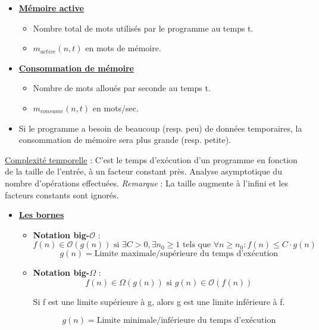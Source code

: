 \documentclass[fr,license=none,skiptoc]{../../../eplsummary}
\newcommand{\bigO}{\ensuremath{\mathcal{O}}}
\begin{document}
\begin{flushleft}
\begin{itemize}
\item \underline{\textbf {Mémoire active}}

\begin{itemize} [label=\textbullet, font=\MEDIUM]
\item Nombre total de mots utilisés par le programme au temps t.
\item $m_{active} (n,t)$ en mots de mémoire.
\end{itemize} \smallbreak

\item \underline{\textbf {Consommation de mémoire}}

\begin{itemize} [label=\textbullet, font=\MEDIUM]
\item Nombre de mots alloués par seconde au temps t.
\item $m_{consume} (n,t)$ en mots/sec.
\end{itemize}

\item Si le programme a besoin de beaucoup (resp. peu) de données temporaires, la consommation de mémoire sera plus grande (resp. petite).

\end{itemize} \bigbreak


\textcolor{mauvedef}{\underline{Complexité temporelle}} : C’est le temps d’exécution d’un programme en fonction de la taille de l’entrée, à un facteur constant près. Analyse asymptotique du nombre d'opérations effectuées. \textit{Remarque} : La taille augmente à l'infini et les facteurs constants sont ignorés.

\begin{itemize}
\item \underline{\textbf {Les bornes}}

\begin{itemize} [label=\textbullet, font=\MEDIUM]
\item \textbf{Notation big-$\bigO$} :
$$f(n) \in \bigO (g(n)) \text{ si } \exists C > 0, \exists n_0 \ge 1 \text{ tels que } \forall n \ge n_0 : f(n) \le C \cdot g(n)   $$
$$g(n) = \text{Limite maximale/supérieure du temps d'exécution}$$
\newpage
\item \textbf{Notation big-$\Omega$} :
$$f(n) \in \Omega (g(n)) \text{  si  } g(n) \in \bigO (f(n))$$
\begin{center} Si f est une limite supérieure à g, alors g est une limite inférieure à f. \end{center}
$$g(n) = \text{Limite minimale/inférieure du temps d'exécution}$$


\end{itemize}
\end{itemize}
\end{flushleft}
\end{document}

